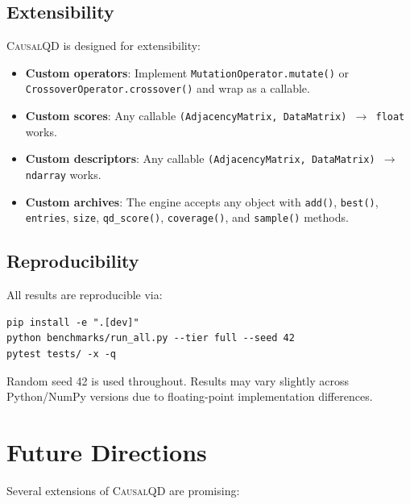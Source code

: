 \documentclass[11pt,a4paper]{article}
\begin{document}
\subsection{Extensibility}

\textsc{CausalQD} is designed for extensibility:

\begin{itemize}[leftmargin=*]
    \item \textbf{Custom operators}: Implement \texttt{MutationOperator.mutate()} or \texttt{CrossoverOperator.crossover()} and wrap as a callable.
    \item \textbf{Custom scores}: Any callable \texttt{(AdjacencyMatrix, DataMatrix) $\to$ float} works.
    \item \textbf{Custom descriptors}: Any callable \texttt{(AdjacencyMatrix, DataMatrix) $\to$ ndarray} works.
    \item \textbf{Custom archives}: The engine accepts any object with \texttt{add()}, \texttt{best()}, \texttt{entries}, \texttt{size}, \texttt{qd\_score()}, \texttt{coverage()}, and \texttt{sample()} methods.
\end{itemize}

\subsection{Reproducibility}

All results are reproducible via:
\begin{verbatim}
pip install -e ".[dev]"
python benchmarks/run_all.py --tier full --seed 42
pytest tests/ -x -q
\end{verbatim}

Random seed 42 is used throughout. Results may vary slightly across Python/NumPy versions due to floating-point implementation differences.

\section{Future Directions}
\label{app:future}

Several extensions of \textsc{CausalQD} are promising:
\end{document}
